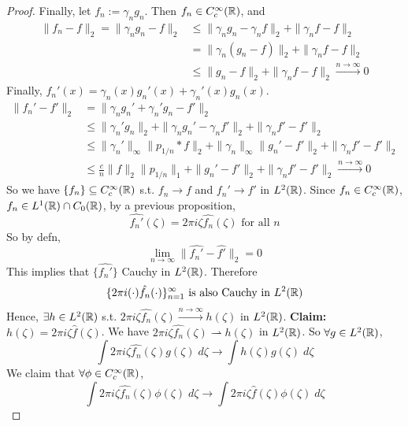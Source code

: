 \begin{proof}
    Finally, let $f_n := \gamma_n g_n$. Then $f_n \in C_c^\infty(\mathbb{R})$, and
    \begin{align*}
        \| f_n - f \|_2 = \| \gamma_n g_n - f \|_2 &\leq \| \gamma_n g_n - \gamma_n f \|_2 + \| \gamma_n f - f \|_2 \\
        &= \| \gamma_n (g_n - f) \|_2 + \| \gamma_n f - f \|_2 \\
        &\leq \| g_n - f \|_2 + \| \gamma_n f - f \|_2 \xrightarrow{n \to \infty} 0        
    \end{align*}   
    Finally, $f_n'(x) = \gamma_n(x) g_n'(x) + \gamma_n'(x) g_n(x)$.
    \begin{align*}
        \| f_n' - f' \|_2 &= \| \gamma_n g_n' + \gamma_n' g_n - f' \|_2 \\
        &\leq \| \gamma_n' g_n \|_2 + \| \gamma_n g_n' - \gamma_n f' \|_2 + \| \gamma_n f' - f' \|_2 \\
        &\leq \| \gamma_n' \|_\infty \| p_{1/n} * f \|_2 + \| \gamma_n \|_\infty \| g_n' - f' \|_2 + \| \gamma_n f' - f' \|_2 \\
        &\leq \frac{c}{n} \| f \|_2 \| p_{1/n} \|_1 + \| g_n' - f' \|_2 + \| \gamma_n f' - f' \|_2 \xrightarrow{n \to \infty} 0            
    \end{align*} 
    So we have $\{f_n\} \subseteq C_c^\infty(\mathbb{R})$ s.t. $f_n \to f$ and $f_n' \to f'$ in $L^2(\mathbb{R})$.
    Since $f_n \in C_c^\infty(\mathbb{R})$, $f_n \in L^1(\mathbb{R}) \cap C_0(\mathbb{R})$, by a previous proposition,
    \[
        \widehat{f_n'}(\zeta) = 2 \pi i \zeta \hat{f_n}(\zeta) \text{ for all } n
    \]   
    So by defn,
    \[
        \lim_{n \to \infty} \| \widehat{f_n'} - \widehat{f'} \|_2 = 0 
    \] 
    This implies that $\{\widehat{f_n'}\}$ Cauchy in $L^2(\mathbb{R})$. Therefore
    \[
        \{2 \pi i (\cdot) \hat{f_n}(\cdot)\}_{n=1}^{\infty} \text{ is also Cauchy in } L^2(\mathbb{R}) 
    \]   
    Hence, $\exists h \in L^2(\mathbb{R})$ s.t. $2 \pi i \zeta \hat{f_n}(\zeta) \xrightarrow{n \to \infty} h(\zeta)$ in $L^2(\mathbb{R})$.
    \newline \textbf{Claim:} $h(\zeta) = 2 \pi i \zeta \hat{f}(\zeta)$.
    \newline \noindent We have $2 \pi i \zeta \hat{f_n}(\zeta) \rightharpoonup h(\zeta)$ in $L^2(\mathbb{R})$.
    So $\forall g \in L^2(\mathbb{R})$,
    \[
        \int 2 \pi i \zeta \hat{f_n}(\zeta) g(\zeta) \; d\zeta \to \int h(\zeta) g(\zeta) \; d\zeta
    \]   
    We claim that $\forall \phi \in C_c^\infty(\mathbb{R})$,
    \[
        \int 2 \pi i \zeta \hat{f_n}(\zeta) \phi(\zeta) \; d\zeta \to \int 2 \pi i \zeta \hat{f}(\zeta) \phi(\zeta) \; d\zeta
    \]  

\end{proof}
